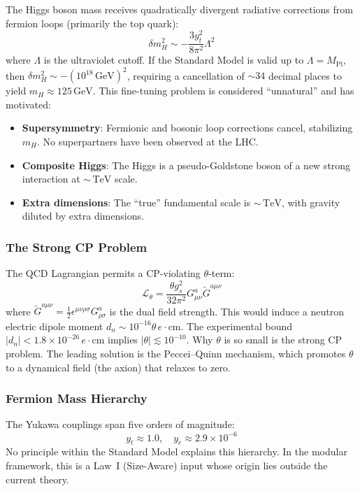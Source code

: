 \documentclass[12pt]{article}
\theoremstyle{definition}
\theoremstyle{remark}
\newcommand{\Lagr}{\mathcal{L}}
\newcommand{\GeV}{\,\mathrm{GeV}}
\newcommand{\TeV}{\,\mathrm{TeV}}
\begin{document}
The Higgs boson mass receives quadratically divergent radiative corrections from fermion loops (primarily the top quark):
\begin{equation}
\delta m_H^2 \sim -\frac{3y_t^2}{8\pi^2} \Lambda^2
\end{equation}
where $\Lambda$ is the ultraviolet cutoff. If the Standard Model is valid up to $\Lambda = M_{\mathrm{Pl}}$, then $\delta m_H^2 \sim -(10^{18}\GeV)^2$, requiring a cancellation of $\sim 34$ decimal places to yield $m_H \approx 125\GeV$. This fine-tuning problem is considered ``unnatural'' and has motivated:
\begin{itemize}
    \item \textbf{Supersymmetry}: Fermionic and bosonic loop corrections cancel, stabilizing $m_H$. No superpartners have been observed at the LHC.
    \item \textbf{Composite Higgs}: The Higgs is a pseudo-Goldstone boson of a new strong interaction at $\sim \TeV$ scale.
    \item \textbf{Extra dimensions}: The ``true'' fundamental scale is $\sim \TeV$, with gravity diluted by extra dimensions.
\end{itemize}

\subsubsection{The Strong CP Problem}

The QCD Lagrangian permits a CP-violating $\theta$-term:
\begin{equation}
\Lagr_\theta = \frac{\theta g_s^2}{32\pi^2} G^a_{\mu\nu} \widetilde{G}^{a\mu\nu}
\end{equation}
where $\widetilde{G}^{a\mu\nu} = \frac{1}{2}\epsilon^{\mu\nu\rho\sigma}G^a_{\rho\sigma}$ is the dual field strength. This would induce a neutron electric dipole moment $d_n \sim 10^{-16}\theta\,e\cdot\mathrm{cm}$. The experimental bound $|d_n| < 1.8 \times 10^{-26}\,e\cdot\mathrm{cm}$ implies $|\theta| \lesssim 10^{-10}$. Why $\theta$ is so small is the strong CP problem. The leading solution is the Peccei--Quinn mechanism, which promotes $\theta$ to a dynamical field (the axion) that relaxes to zero.

\subsubsection{Fermion Mass Hierarchy}

The Yukawa couplings span five orders of magnitude:
\begin{equation}
y_t \approx 1.0, \quad y_e \approx 2.9 \times 10^{-6}
\end{equation}
No principle within the Standard Model explains this hierarchy. In the modular framework, this is a Law~I (Size-Aware) input whose origin lies outside the current theory.
\end{document}
